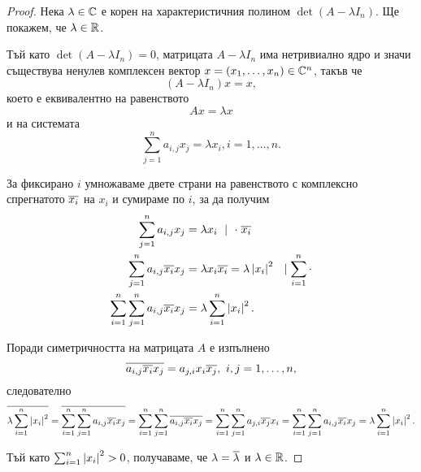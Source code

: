 \documentclass[numbers=endperiod, DIV=15, bibliography=totocnumbered]{scrartcl}
\begin{document}
\begin{proof}
  Нека $\lambda \in \mathbb{C}$ е корен на характеристичния полином $\det(A - \lambda I_n)$. Ще покажем, че $\lambda \in \mathbb{R}$.

  Тъй като $\det(A - \lambda I_n) = 0$, матрицата $A - \lambda I_n$ има нетривиално ядро и значи съществува ненулев комплексен вектор $x = (x_1, \ldots, x_n) \in \mathbb{C}^n$, такъв че
  \begin{displaymath}
    (A - \lambda I_n) x = x,
  \end{displaymath}
  което е еквивалентно на равенството
  \begin{displaymath}
    A x = \lambda x
  \end{displaymath}
  и на системата
  \begin{displaymath}
    \sum_{j=1}^n a_{i,j} x_j = \lambda x_i, i = 1, \ldots, n.
  \end{displaymath}

  За фиксирано $i$ умножаваме двете страни на равенството с комплексно спрегнатото $\overline{x_i}$ на $x_i$ и сумираме по $i$, за да получим
  \begin{align*}
    \sum_{j=1}^n a_{i,j} x_j
    &=
    \lambda x_i~\mid~\cdot \; \overline{x_i}
    \\
    \sum_{j=1}^n a_{i,j} \overline{x_i} x_j
    &=
    \lambda x_i \overline{x_i} = \lambda \left\vert x_i \right\vert^2~~\mid \sum_{i=1}^n \cdot
    \\
    \sum_{i=1}^n \sum_{j=1}^n a_{i,j} \overline{x_i} x_j
    &=
    \lambda \sum_{i=1}^n \left\vert x_i \right\vert^2.
  \end{align*}

  Поради симетричността на матрицата $A$ е изпълнено
  \begin{displaymath}
    \overline{a_{i,j} \overline{x_i} x_j}
    =
    a_{j,i} x_i \overline{x_j},~i, j = 1, \ldots, n,
  \end{displaymath}
  следователно
  \begin{displaymath}
    \overline{\lambda \sum_{i=1}^n \left\vert x_i \right\vert^2}
    =
    \overline{\sum_{i=1}^n \sum_{j=1}^n a_{i,j} \overline{x_i} x_j}
    =
    \sum_{i=1}^n \sum_{j=1}^n \overline{a_{i,j} \overline{x_i} x_j}
    =
    \sum_{i=1}^n \sum_{j=1}^n a_{j,i} \overline{x_j} x_i
    =
    \sum_{i=1}^n \sum_{j=1}^n a_{i,j} \overline{x_i} x_j
    =
    \lambda \sum_{i=1}^n \left\vert x_i \right\vert^2.
  \end{displaymath}

  Тъй като $\sum_{i=1}^n \left\vert x_i \right\vert^2 > 0$, получаваме, че $\lambda = \overline{\lambda}$ и $\lambda \in \mathbb{R}$.
\end{proof}
\end{document}
